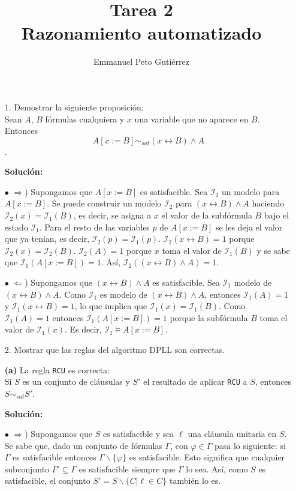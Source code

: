 \documentclass{article}
\author{Emmanuel Peto Gutiérrez}
\title{Tarea 2\\Razonamiento automatizado}
\begin{document}
\maketitle

\begin{itemize}
\item[1.] Demostrar la siguiente proposición:\\Sean $A$, $B$ fórmulas cualquiera y $x$ una variable que no aparece en $B$. Entonces $$A[x := B] \sim_{sat} (x \leftrightarrow B) \wedge A $$.

\textbf{Solución:}

$\bullet$ $\Rightarrow$) Supongamos que $A[x:=B]$ es satisfacible. Sea $\mathcal{I}_1$ un modelo para $A[x:=B]$. Se puede construir un modelo $\mathcal{I}_2$ para $(x \leftrightarrow B) \wedge A$ haciendo $\mathcal{I}_2 (x) = \mathcal{I}_1 (B)$, es decir, se asigna a $x$ el valor de la subfórmula $B$ bajo el estado $\mathcal{I}_1$. Para el resto de las variables $p$ de $A[x:=B]$ se les deja el valor que ya tenían, es decir, $\mathcal{I}_2 (p) = \mathcal{I}_1 (p)$. $\mathcal{I}_2 (x \leftrightarrow B) = 1$ porque $\mathcal{I}_2 (x) = \mathcal{I}_2 (B)$. $\mathcal{I}_2 (A) = 1$ porque $x$ toma el valor de $\mathcal{I}_1 (B)$ y se sabe que $\mathcal{I}_1 (A[x:=B]) = 1$. Así, $\mathcal{I}_2 ((x \leftrightarrow B) \wedge A) =1$.

$\bullet$ $\Leftarrow$) Supongamos que $(x \leftrightarrow B) \wedge A$ es satisfacible. Sea $\mathcal{I}_1$ modelo de $(x \leftrightarrow B) \wedge A$. Como $\mathcal{I}_1$ es modelo de $(x \leftrightarrow B) \wedge A$, entonces $\mathcal{I}_1 (A) = 1$ y $\mathcal{I}_1 (x \leftrightarrow B) = 1$, lo que implica que $\mathcal{I}_1 (x) = \mathcal{I}_1 (B)$. Como $\mathcal{I}_1 (A) = 1$ entonces $\mathcal{I}_1 (A[x:=B]) = 1$ porque la subfórmula $B$ toma el valor de $\mathcal{I}_1 (x)$. Es decir, $\mathcal{I}_1 \models A[x:=B]$.


\item[2.] Mostrar que las reglas del algoritmo DPLL son correctas.

\textbf{(a)} La regla \texttt{RCU} es correcta:\\Si $S$ es un conjunto de cláusulas y $S'$ el resultado de aplicar \texttt{RCU} a $S$, entonces $S \sim_{sat} S'$.

\textbf{Solución:}

$\bullet$ $\Rightarrow$) Supongamos que $S$ es satisfacible y sea $\ell$ una cláusula unitaria en $S$. Se sabe que, dado un conjunto de fórmulas $\Gamma$, con $\varphi \in \Gamma$ pasa lo siguiente: si $\Gamma$ es satisfacible entonces $\Gamma \backslash \{ \varphi \}$ es satisfacible. Esto significa que cualquier subconjunto $\Gamma' \subseteq \Gamma$ es satisfacible siempre que $\Gamma$ lo sea. Así, como $S$ es satisfacible, el conjunto $S' = S \backslash \{ C | \ell \in  C\}$ también lo es.


\end{itemize}
\end{document}
